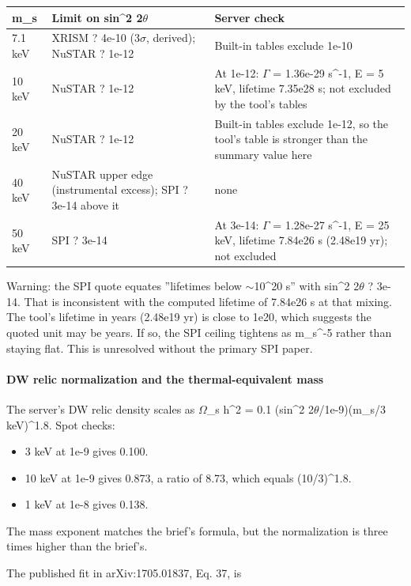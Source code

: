\documentclass[11pt,a4paper]{article}
\begin{document}
\begin{longtable}{@{}p{}p{}p{}@{}}
\toprule
\textbf{m\_s} & \textbf{Limit on sin\textasciicircum{}2 2$\theta$} & \textbf{Server check} \\ \midrule \endhead
7.1 keV & XRISM ? 4e-10 (3$\sigma$, derived); NuSTAR ? 1e-12 & Built-in tables exclude 1e-10 \\
10 keV & NuSTAR ? 1e-12 & At 1e-12: $\Gamma$ = 1.36e-29 s\textasciicircum{}-1, E = 5 keV, lifetime 7.35e28 s; not excluded by the tool's tables \\
20 keV & NuSTAR ? 1e-12 & Built-in tables exclude 1e-12, so the tool's table is stronger than the summary value here \\
40 keV & NuSTAR upper edge (instrumental excess); SPI ? 3e-14 above it & none \\
50 keV & SPI ? 3e-14 & At 3e-14: $\Gamma$ = 1.28e-27 s\textasciicircum{}-1, E = 25 keV, lifetime 7.84e26 s (2.48e19 yr); not excluded \\
\bottomrule\end{longtable}
Warning: the SPI quote equates ''lifetimes below $\sim$10\textasciicircum{}20 s'' with sin\textasciicircum{}2 2$\theta$ ? 3e-14. That is inconsistent with the computed lifetime of 7.84e26 s at that mixing. The tool's lifetime in years (2.48e19 yr) is close to 1e20, which suggests the quoted unit may be years. If so, the SPI ceiling tightens as m\_s\textasciicircum{}-5 rather than staying flat. This is unresolved without the primary SPI paper.

\paragraph{DW relic normalization and the thermal-equivalent mass}
The server's DW relic density scales as $\Omega$\_s h\textasciicircum{}2 = 0.1 (sin\textasciicircum{}2 2$\theta$/1e-9)(m\_s/3 keV)\textasciicircum{}1.8. Spot checks:

\begin{itemize}
  \item 3 keV at 1e-9 gives 0.100.
  \item 10 keV at 1e-9 gives 0.873, a ratio of 8.73, which equals (10/3)\textasciicircum{}1.8.
  \item 1 keV at 1e-8 gives 0.138.
\end{itemize}
The mass exponent matches the brief's formula, but the normalization is three times higher than the brief's.

The published fit in arXiv:1705.01837, Eq. 37, is
\end{document}
